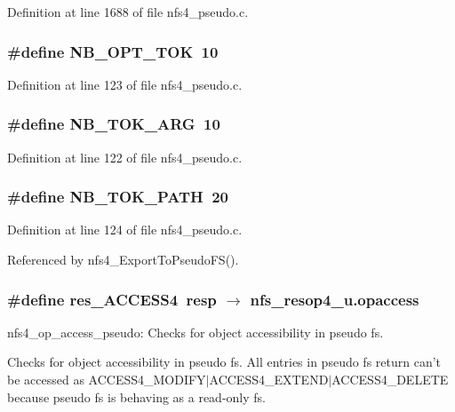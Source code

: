 Definition at line 1688 of file nfs4\_\-pseudo.c.
\subsubsection{\setlength{\rightskip}{0pt plus 5cm}\#define NB\_\-OPT\_\-TOK\ 10}\label{nfs4__pseudo_8c_a1}




Definition at line 123 of file nfs4\_\-pseudo.c.
\subsubsection{\setlength{\rightskip}{0pt plus 5cm}\#define NB\_\-TOK\_\-ARG\ 10}\label{nfs4__pseudo_8c_a0}




Definition at line 122 of file nfs4\_\-pseudo.c.
\subsubsection{\setlength{\rightskip}{0pt plus 5cm}\#define NB\_\-TOK\_\-PATH\ 20}\label{nfs4__pseudo_8c_a2}




Definition at line 124 of file nfs4\_\-pseudo.c.

Referenced by nfs4\_\-Export\-To\-Pseudo\-FS().
\subsubsection{\setlength{\rightskip}{0pt plus 5cm}\#define res\_\-ACCESS4\ resp $\rightarrow$ nfs\_\-resop4\_\-u.opaccess}\label{nfs4__pseudo_8c_a5}


nfs4\_\-op\_\-access\_\-pseudo: Checks for object accessibility in pseudo fs.

Checks for object accessibility in pseudo fs. All entries in pseudo fs return can't be accessed as ACCESS4\_\-MODIFY$|$ACCESS4\_\-EXTEND$|$ACCESS4\_\-DELETE because pseudo fs is behaving as a read-only fs.

